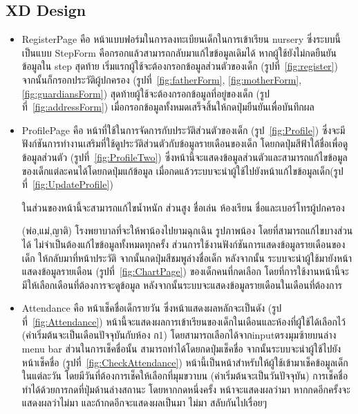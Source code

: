 \subsection{XD Design}

\begin{itemize}
  \item RegisterPage คือ หน้าแบบฟอร์มในการลงทะเบียนเด็กในการเข้าเรียน nursery 
  ซึ่งระบบนี้เป็นแบบ StepForm คือกรอกแล้วสามารถกลับมาแก้ไขข้อมูลเดิมได้ หากผู้ใช้ยังไม่กดยืนยันข้อมูลใน step สุดท้าย
  เริ่มแรกผู้ใช้จะต้องกรอกข้อมูลส่วนตัวของเด็ก (รูปที่~\ref{fig:register}) 
  จากนั้นก็กรอกประวัติผู้ปกครอง (รูปที่~\ref{fig:fatherForm}, \ref{fig:motherForm}, \ref{fig:guardiansForm})
  สุดท้ายผู้ใช้จะต้องกรอกข้อมูลที่อยู่ของเด็ก (รูปที่~\ref{fig:addressForm}) เมื่อกรอกข้อมูลทั้งหมดเสร็จสิ้นให้กดปุ่มยืนยันเพื่อบันทึกผล
  
  \item  ProfilePage คือ หน้าที่ใช้ในการจัดการกับประวัติส่วนตัวของเด็ก (รูป~\ref{fig:Profile}) ซึ่งจะมีฟังก์ชันการทำงานเสริมที่ใช้ดูประวัติส่วนตัวกับข้อมูลรายเดือนของเด็ก
  โดยกดปุ่มสีฟ้าใต้ชื่อเพื่อดูข้อมูลส่วนตัว (รูปที่~\ref{fig:ProfileTwo}) ซึ่งหน้านี้จะแสดงข้อมูลส่วนตัวและสามารถแก้ไขข้อมูลของเด็กแต่ละคนได้โดยกดปุ่มแก้ข้อมูล เมื่อกดแล้วระบบจะนำผู้ใช้ไปยังหน้าแก้ไขข้อมูลเด็ก(รูปที่~\ref{fig:UpdateProfile}) 
  
  ในส่วนของหน้านี้จะสามารถแก้ไขน้ำหนัก ส่วนสูง ชื่อเล่น ห้องเรียน ชื่อและเบอร์โทรผู้ปกครอง 
  
  (พ่อ,แม่,ญาติ) โรงพยาบาลที่จะให้พาน้องไปยามฉุกเฉิน รูปภาพน้อง โดยที่สามารถแก้ไขบางส่วนได้ ไม่จำเป็นต้องแก้ไขข้อมูลทั้งหมดทุกครั้ง 
  ส่วนการใช้งานฟังก์ชันการแสดงข้อมูลรายเดือนของเด็ก ให้กลับมาที่หน้าประวัติ จากนั้นกดปุ่มสีชมพูล่างชื่อเด็ก หลังจากนั้น
  ระบบจะนำผู้ใช้มายังหน้าแสดงข้อมูลรายเดือน (รูปที่~\ref{fig:ChartPage}) ของเด็กคนที่กดเลือก โดยที่การใช้งานหน้านี้จะมีให้เลือกเดือนที่ต้องการจะดูข้อมูล หลังจากนั้นระบบจะแสดงข้อมูลรายเดือนในเดือนที่ต้องการ
  
  \item  Attendance คือ หน้าเช็คชื่อเด็กรายวัน ซึ่งหน้าแสดงผลหลักจะเป็นดัง (รูปที่~\ref{fig:Attendance}) หน้านี้จะแสดงผลการเข้าเรียนของเด็กในเดือนและห้องที่ผู้ใช้ได้เลือกไว้ (ค่าเริ่มต้นจะเป็นเดือนปัจจุบันกับห้อง ก1) 
  โดยสามารถเลือกได้จากinputตรงมุมซ้ายบนล่าง menu bar ส่วนในการเช็คชื่อนั้น สามารถทำได้โดยกดปุ่มเช็คชื่อ
  จากนั้นระบบจะนำผู้ใช้ไปยังหน้าเช็คชื่อ (รูปที่~\ref{fig:CheckAttendance}) หน้านี้เป็นหน้าสำหรับให้ผู้ใช้เข้ามาเช็คข้อมูลเด็กในแต่ละวัน โดยมีวันที่ต้องการเช็คให้เลือกที่มุมขวาบน (ค่าเริ่มต้นจะเป็นวันปัจจุบัน) การเช็คชื่อทำได้ด้วยการกดที่ปุ่มด้านล่างสถานะ โดยหากกดหนึ่งครั้ง
  หน้าจะแสดงผลว่ามา หากกดอีกครั้งจะแสดงผลว่าไม่มา และถ้ากดอีกจะแสดงผลเป็นมา ไม่มา สลับกันไปเรื่อยๆ


\end{itemize}
